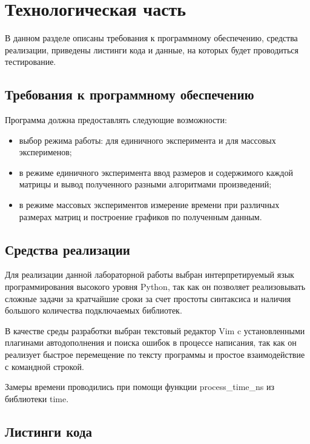 \chapter{Технологическая часть}

В данном разделе описаны требования к программному обеспечению, средства
реализации, приведены листинги кода и данные, на которых будет проводиться
тестирование.

\section{Требования к программному обеспечению}

Программа должна предоставлять следующие возможности:
\begin{itemize}[left=\parindent]
    \item выбор режима работы: для единичного эксперимента и для массовых
          эксперименов;
    \item в режиме единичного эксперимента ввод размеров и содержимого каждой
          матрицы и вывод полученного разными алгоритмами произведений;
    \item в режиме массовых экспериментов измерение времени при различных
          размерах матриц и построение графиков по полученным данным.
\end{itemize}

\section{Средства реализации}

Для реализации данной лабораторной работы выбран интерпретируемый язык
программирования высокого уровня Python\cite{python}, так как он позволяет
реализовывать сложные задачи за кратчайшие сроки за счет простоты синтаксиса и
наличия большого количества подключаемых библиотек. 

В качестве среды разработки выбран текстовый редактор Vim\cite{vim} c
установленными плагинами автодополнения и поиска ошибок в процессе написания,
так как он реализует быстрое перемещение по тексту программы и простое
взаимодействие с командной строкой.

Замеры времени проводились при помощи функции process\_time\_ns из библиотеки
time\cite{time}.

\section{Листинги кода}

